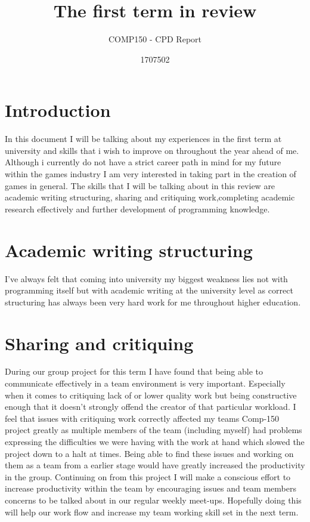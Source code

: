 \documentclass{scrartcl}
\title{The first term in review }
\subtitle{COMP150 - CPD Report}
\author{1707502}
\begin{document}
\maketitle

\section{Introduction}
In this document I will be talking about my experiences in the first term at university and skills that i wish to improve on throughout the year ahead of me.
Although i currently do not have a strict career path in mind for my future within the games industry I am very interested in taking part in the creation of games in general. The skills that I will be talking about in this review are academic writing structuring, sharing and critiquing work,completing academic research effectively and further development of programming knowledge.   

\section{Academic writing structuring}

I've always felt that coming into university my biggest weakness lies not with programming itself but with academic writing at the university level as correct structuring has always been very hard work for me throughout higher education.   

\section{Sharing and critiquing}

During our group project for this term I have found that being able to communicate effectively in a team environment is very important. Especially when it comes to critiquing lack of or lower quality work but being constructive enough that it doesn't strongly offend the creator of that particular workload. I feel that issues with critiquing work correctly affected my teams Comp-150 project greatly as multiple members of the team (including myself) had problems expressing the difficulties we were having with the work at hand which slowed the project down to a halt at times. Being able to find these issues and working on them as a team from a earlier stage would have greatly increased the productivity in the group. Continuing on from this project I will make a conscious effort to increase productivity within the team by encouraging issues and team members concerns to be talked about in our regular weekly meet-ups. Hopefully doing this will help our work flow and increase my team working skill set in the next term. 
\end{document}
